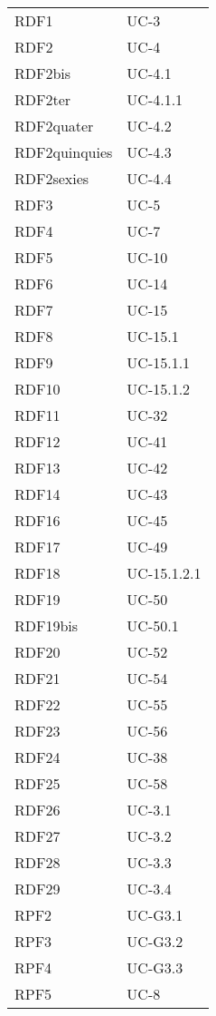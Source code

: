 \begin{longtable}{| p{5cm} | p{5cm} |}
		RDF1 & UC-3\\
		RDF2 & UC-4\\
		RDF2bis & UC-4.1 \\
		RDF2ter & UC-4.1.1 \\
		RDF2quater & UC-4.2 \\
		RDF2quinquies & UC-4.3 \\
		RDF2sexies & UC-4.4 \\
		\rowcolor{LightGray}
		RDF3 & UC-5\\
		RDF4 & UC-7\\
		\rowcolor{LightGray}
		RDF5 & UC-10\\
		RDF6 & UC-14\\
		\rowcolor{LightGray}
		RDF7 & UC-15\\
		RDF8 & UC-15.1\\
		\rowcolor{LightGray}
		RDF9 & UC-15.1.1\\
		RDF10 & UC-15.1.2\\
		\rowcolor{LightGray}
		RDF11 & UC-32\\
		RDF12 & UC-41\\
		\rowcolor{LightGray}
		RDF13 & UC-42\\
		RDF14 & UC-43\\
		\rowcolor{LightGray}
		RDF16 & UC-45\\
		RDF17 & UC-49 \\
		\rowcolor{LightGray}
		RDF18 & UC-15.1.2.1 \\
		RDF19 & UC-50 \\
		RDF19bis & UC-50.1 \\
		\rowcolor{LightGray}
		RDF20 & UC-52 \\
		RDF21 & UC-54 \\
		\rowcolor{LightGray}
		RDF22 & UC-55 \\
		RDF23 & UC-56 \\
		\rowcolor{LightGray}
		RDF24 & UC-38\\
		RDF25 & UC-58\\
		\rowcolor{LightGray}
		RDF26 & UC-3.1\\
		RDF27 & UC-3.2\\
		\rowcolor{LightGray}
		RDF28 & UC-3.3\\
		RDF29 & UC-3.4\\
		\rowcolor{LightGray}
		RPF2 & UC-G3.1\\
		\rowcolor{LightGray}
		RPF3 & UC-G3.2\\
		RPF4 & UC-G3.3\\
		\rowcolor{LightGray}
		RPF5 & UC-8\\

\end{longtable}
